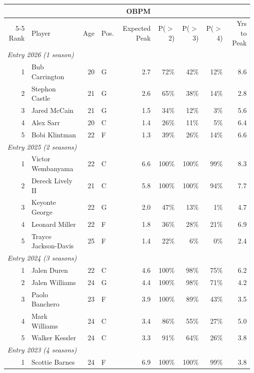 \begin{table}[htbp]
  \centering\small
  \begin{tabular}{rlrlrrrrr}
    \toprule
     & & & & OBPM & & & & \\
    \cmidrule(lr){5-5}
    Rank & Player & Age & Pos. & Expected Peak & P($>$2) & P($>$3) & P($>$4) & Yrs to Peak \\
    \midrule
    \multicolumn{9}{l}{\textit{Entry 2026 (1 season)}} \\
    \midrule
    1 & Bub Carrington & 20 & G & 2.7 & 72\% & 42\% & 12\% & 8.6 \\
    2 & Stephon Castle & 21 & G & 2.6 & 65\% & 38\% & 14\% & 2.8 \\
    3 & Jared McCain & 21 & G & 1.5 & 34\% & 12\% & 3\% & 5.6 \\
    4 & Alex Sarr & 20 & C & 1.4 & 26\% & 11\% & 5\% & 6.4 \\
    5 & Bobi Klintman & 22 & F & 1.3 & 39\% & 26\% & 14\% & 6.6 \\
    \midrule[0.4pt]
    \multicolumn{9}{l}{\textit{Entry 2025 (2 seasons)}} \\
    \midrule
    1 & Victor Wembanyama & 22 & C & 6.6 & 100\% & 100\% & 99\% & 8.3 \\
    2 & Dereck Lively II & 21 & C & 5.8 & 100\% & 100\% & 94\% & 7.7 \\
    3 & Keyonte George & 22 & G & 2.0 & 47\% & 13\% & 1\% & 4.7 \\
    4 & Leonard Miller & 22 & F & 1.8 & 36\% & 28\% & 21\% & 6.9 \\
    5 & Trayce Jackson-Davis & 25 & F & 1.4 & 22\% & 6\% & 0\% & 2.4 \\
    \midrule[0.4pt]
    \multicolumn{9}{l}{\textit{Entry 2024 (3 seasons)}} \\
    \midrule
    1 & Jalen Duren & 22 & C & 4.6 & 100\% & 98\% & 75\% & 6.2 \\
    2 & Jalen Williams & 24 & G & 4.4 & 100\% & 98\% & 71\% & 4.2 \\
    3 & Paolo Banchero & 23 & F & 3.9 & 100\% & 89\% & 43\% & 3.5 \\
    4 & Mark Williams & 24 & C & 3.4 & 86\% & 55\% & 27\% & 5.0 \\
    5 & Walker Kessler & 24 & C & 3.3 & 91\% & 64\% & 26\% & 3.8 \\
    \midrule[0.4pt]
    \multicolumn{9}{l}{\textit{Entry 2023 (4 seasons)}} \\
    \midrule
    1 & Scottie Barnes & 24 & F & 6.9 & 100\% & 100\% & 99\% & 3.8 \\

\end{tabular}
\end{table}
